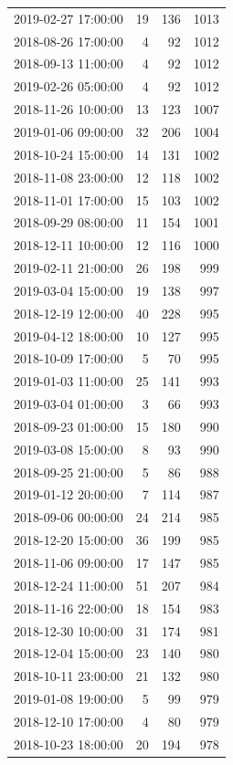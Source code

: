 \begin{tabular}{lrrr}
2019-02-27 17:00:00 & 19 & 136 & 1013 \\
2018-08-26 17:00:00 & 4 & 92 & 1012 \\
2018-09-13 11:00:00 & 4 & 92 & 1012 \\
2019-02-26 05:00:00 & 4 & 92 & 1012 \\
2018-11-26 10:00:00 & 13 & 123 & 1007 \\
2019-01-06 09:00:00 & 32 & 206 & 1004 \\
2018-10-24 15:00:00 & 14 & 131 & 1002 \\
2018-11-08 23:00:00 & 12 & 118 & 1002 \\
2018-11-01 17:00:00 & 15 & 103 & 1002 \\
2018-09-29 08:00:00 & 11 & 154 & 1001 \\
2018-12-11 10:00:00 & 12 & 116 & 1000 \\
2019-02-11 21:00:00 & 26 & 198 & 999 \\
2019-03-04 15:00:00 & 19 & 138 & 997 \\
2018-12-19 12:00:00 & 40 & 228 & 995 \\
2019-04-12 18:00:00 & 10 & 127 & 995 \\
2018-10-09 17:00:00 & 5 & 70 & 995 \\
2019-01-03 11:00:00 & 25 & 141 & 993 \\
2019-03-04 01:00:00 & 3 & 66 & 993 \\
2018-09-23 01:00:00 & 15 & 180 & 990 \\
2019-03-08 15:00:00 & 8 & 93 & 990 \\
2018-09-25 21:00:00 & 5 & 86 & 988 \\
2019-01-12 20:00:00 & 7 & 114 & 987 \\
2018-09-06 00:00:00 & 24 & 214 & 985 \\
2018-12-20 15:00:00 & 36 & 199 & 985 \\
2018-11-06 09:00:00 & 17 & 147 & 985 \\
2018-12-24 11:00:00 & 51 & 207 & 984 \\
2018-11-16 22:00:00 & 18 & 154 & 983 \\
2018-12-30 10:00:00 & 31 & 174 & 981 \\
2018-12-04 15:00:00 & 23 & 140 & 980 \\
2018-10-11 23:00:00 & 21 & 132 & 980 \\
2019-01-08 19:00:00 & 5 & 99 & 979 \\
2018-12-10 17:00:00 & 4 & 80 & 979 \\
2018-10-23 18:00:00 & 20 & 194 & 978 \\

\end{tabular}
